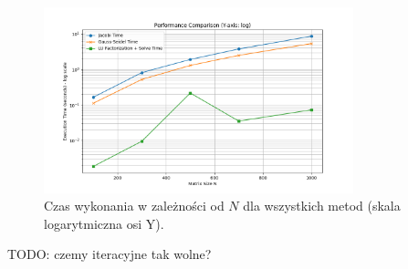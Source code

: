 \documentclass[a4paper, 11pt]{article}
\begin{document}
\begin{figure}[H]
    \centering
    \includegraphics[width=0.8\textwidth]{performance_plot_log_scale}
    \caption{Czas wykonania w zależności od $N$ dla wszystkich metod (skala logarytmiczna osi Y).}
    \label{fig:task_e_log}
\end{figure}

TODO: czemy iteracyjne tak wolne?
\end{document}
